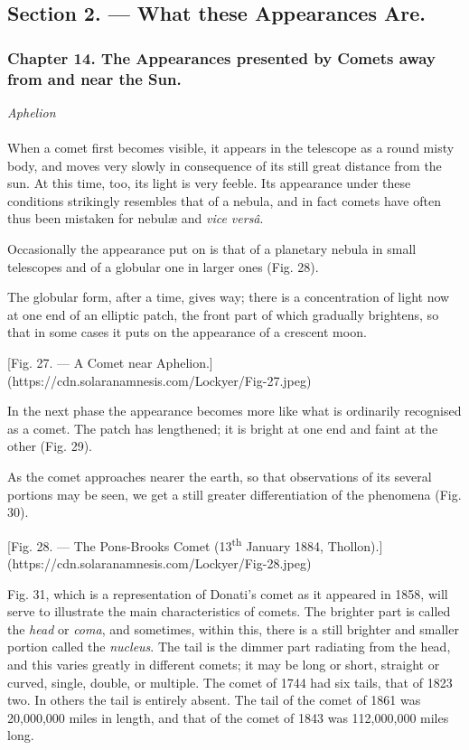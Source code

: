 \documentclass[a4paper, 12pt, oneside, polutonikogreek, english]{article}
\begin{document}
\subsection{Section 2. --- What these Appearances Are.}
\subsubsection{Chapter 14. The Appearances presented by Comets away from and near the Sun.}
\begin{center}
\emph{Aphelion}
\end{center}
\paragraph{}
When a comet first becomes visible, it appears in the telescope as a round misty body, and moves very slowly in consequence of its still great distance from the sun. At this time, too, its light is very feeble. Its appearance under these conditions strikingly resembles that of a nebula, and in fact comets have often thus been mistaken for nebulæ and \emph{vice versâ}.

Occasionally the appearance put on is that of a planetary nebula in small telescopes and of a globular one in larger ones (Fig. 28).

The globular form, after a time, gives way; there is a concentration of light now at one end of an elliptic patch, the front part of which gradually brightens, so that in some cases it puts on the appearance of a crescent moon.

[Fig. 27. --- A Comet near Aphelion.](https://cdn.solaranamnesis.com/Lockyer/Fig-27.jpeg)

In the next phase the appearance becomes more like what is ordinarily recognised as a comet. The patch has lengthened; it is bright at one end and faint at the other (Fig. 29).

As the comet approaches nearer the earth, so that observations of its several portions may be seen, we get a still greater differentiation of the phenomena (Fig. 30).

[Fig. 28. --- The Pons-Brooks Comet (13\textsuperscript{th} January 1884, Thollon).](https://cdn.solaranamnesis.com/Lockyer/Fig-28.jpeg)

Fig. 31, which is a representation of Donati's comet as it appeared in 1858, will serve to illustrate the main characteristics of comets. The brighter part is called the \emph{head} or \emph{coma}, and sometimes, within this, there is a still brighter and smaller portion called the \emph{nucleus}. The tail is the dimmer part radiating from the head, and this varies greatly in different comets; it may be long or short, straight or curved, single, double, or multiple. The comet of 1744 had six tails, that of 1823 two. In others the tail is entirely absent. The tail of the comet of 1861 was 20,000,000 miles in length, and that of the comet of 1843 was 112,000,000 miles long.
\end{document}
